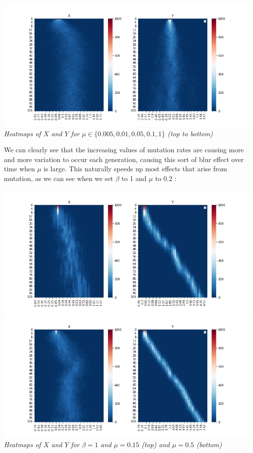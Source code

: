 \documentclass{article}
\begin{document}
\begin{center}
\includegraphics[scale=0.37]{heatmap_mu_1.0} \\
\textit{Heatmaps of $X$ and $Y$ for $\mu \in \lbrace 0.005,0.01,0.05,0.1,1 \rbrace$ (top to bottom)}
\end{center}

We can clearly see that the increasing values of mutation rates are causing more and more variation to occur each generation, causing this sort of blur effect over time when $\mu$ is large. This naturally speeds up most effects that arise from mutation, as we can see when we set $\beta$ to 1 and $\mu$ to $0.2$ : \\

\begin{center}
\includegraphics[scale=0.37]{beta=1mu=0.15}
\includegraphics[scale=0.37]{beta=1mu=0.5} \\
\textit{Heatmaps of $X$ and $Y$ for $\beta = 1$ and $\mu = 0.15$ (top) and $\mu = 0.5$ (bottom)}
\end{center}
\end{document}

